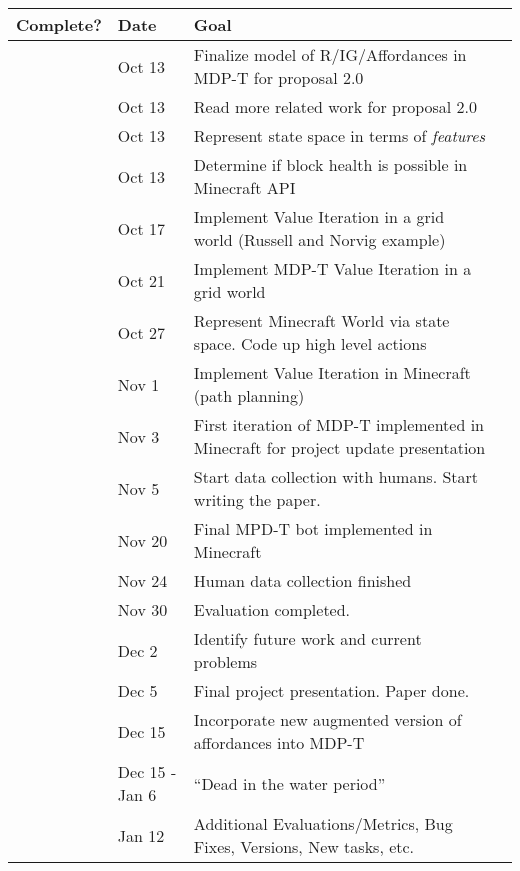 \documentclass[a4paper]{article}
\begin{document}
\begin{center}
    \begin{tabular}{ | l | l | l | p{5cm} |}
    \hline
    {\bf Complete?} & {\bf Date} & {\bf Goal} \\ \hline
     & Oct 13 & Finalize model of R/IG/Affordances in MDP-T for proposal 2.0\\ \hline
     & Oct 13 & Read more related work for proposal 2.0 \\ \hline
     & Oct 13 & Represent state space in terms of {\it features} \\ \hline
     & Oct 13 & Determine if block health is possible in Minecraft API\\ \hline
     & Oct 17 & Implement Value Iteration in a grid world (Russell and Norvig example)\\ \hline
     & Oct 21 & Implement MDP-T Value Iteration in a grid world \\ \hline
     & Oct 27 & Represent Minecraft World via state space. Code up high level actions \\ \hline
     & Nov 1 & Implement Value Iteration in Minecraft (path planning)\\ \hline
     & Nov 3  & First iteration of MDP-T implemented in Minecraft for project update presentation\\ \hline
     & Nov 5 & Start data collection with humans. Start writing the paper. \\ \hline
     & Nov 20 & Final MPD-T bot implemented in Minecraft\\ \hline
     & Nov 24 & Human data collection finished \\ \hline
     & Nov 30 & Evaluation completed. \\ \hline
     & Dec 2 & Identify future work and current problems \\ \hline
     & Dec 5 & Final project presentation. Paper done. \\ \hline
     & Dec 15 & Incorporate new augmented version of affordances into MDP-T \\ \hline

     & Dec 15 - Jan 6 & ``Dead in the water period'' \\ \hline
     & Jan 12 & Additional Evaluations/Metrics, Bug Fixes, Versions, New tasks, etc. \\ \hline
    \end{tabular}
\end{center}
\end{document}

